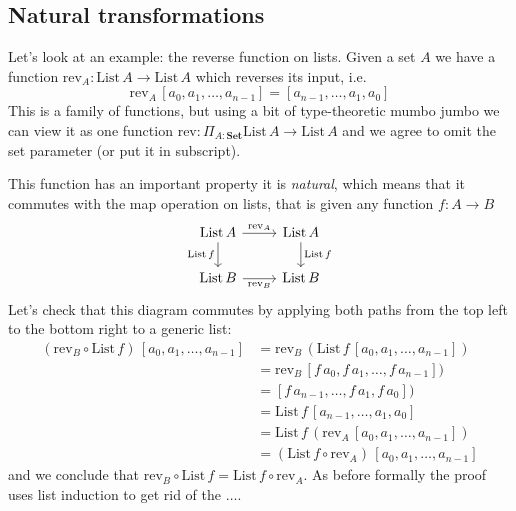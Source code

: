 \documentclass{article}
\newcommand{\Set}{\mathbf{Set}}
\newcommand{\List}{\mathrm{List}}
\newcommand{\rev}{\mathrm{rev}}
\begin{document}
\subsection{Natural transformations}
\label{sec:natfns}

Let's look at an example: the reverse function on lists. Given a set $A$ we have a function $\rev_A : \List\,A \to \List\,A$ which reverses its input, i.e. 
\[\rev_A\, [a_0,a_1,\dots,a_{n-1}] = [a_{n-1},\dots,a_1,a_0]\]
This is a family of functions, but using a bit of type-theoretic mumbo jumbo we can view it as one function $\rev : \Pi_{A:\Set} \List\,A \to \List\,A$ and we agree to omit the set parameter (or put it in subscript). 

This function has an important property it is \emph{natural}, which means that it commutes with the map operation on lists, that is given any function 
$f : A \to B$
\[\begin{tikzcd}
\List\,A \arrow[r,"\rev_A"] \arrow[d,"\List\,f" left] & \List\,A \arrow[d,"\List\,f"]\\
\List\,B \arrow[r,"\rev_B" below] & \List\,B
\end{tikzcd}
\]
Let's check that this diagram commutes by applying both paths from the top left to the bottom right to a generic list:
\begin{align*}
(\rev_B \circ \List\,f)\, [a_0,a_1,\dots,a_{n-1}] 
& = \rev_B\,(\List\,f\, [a_0,a_1,\dots,a_{n-1}]) \\
& = \rev_B\,[f\,a_0,f\,a_1,\dots,f\,a_{n-1}]) \\
& = [f\,a_{n-1}, \dots,f\,a_1,f\,a_0]) \\
& = \List\,f\, [a_{n-1},\dots,a_1,a_0]\\
& = \List\,f\,(\rev_A\, [a_0,a_1,\dots,a_{n-1}])\\
& = (\List\,f\circ \rev_A)\, [a_0,a_1,\dots,a_{n-1}]
\end{align*}
and we conclude that $\rev_B \circ \List\,f = \List\,f\circ \rev_A$. As before formally the proof uses list induction to get rid of the $\dots$.
\end{document}
